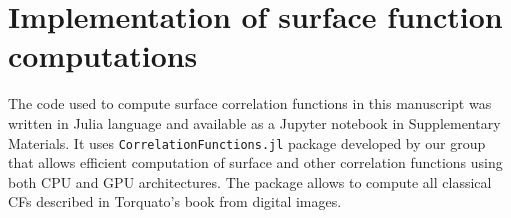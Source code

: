 \documentclass[reprint,amsmath,amssymb,aps,pre,showkeys,showpacs]{revtex4-1}
\newcommand{\code}[1]{\colorbox{light-gray}{\texttt{#1}}}
\begin{document}
\section{Implementation of surface function computations}
\label{ap:b_code}
The code used to compute surface correlation functions in this manuscript was
written in Julia language and available as a Jupyter notebook in Supplementary
Materials. It uses \code{CorrelationFunctions.jl} package developed by our group
\cite{CFsjlpaper} that allows efficient computation of surface and other
correlation functions using both CPU and GPU architectures. The package allows
to compute all classical CFs described in Torquato’s book \cite{Torquato_book}
from digital images.


\end{document}
